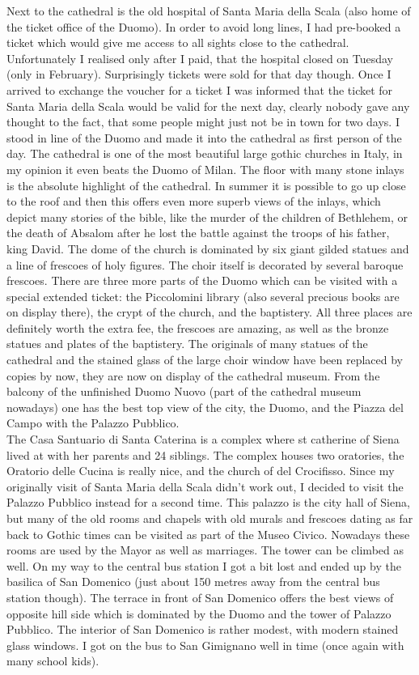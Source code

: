  Next to the cathedral is the old hospital of Santa Maria della Scala (also home of the ticket office of the Duomo). In order to avoid long lines, I had pre-booked a ticket which would give me access to all sights close to the cathedral. Unfortunately I realised only after I paid, that the hospital closed on Tuesday (only in February). Surprisingly tickets were sold for that day though. Once I arrived to exchange the voucher for a ticket I was informed that the ticket for Santa Maria della Scala would be valid for the next day, clearly nobody gave any thought to the fact, that some people might just not be in town for two days. I stood in line of the Duomo and made it into the cathedral as first person of the day. The cathedral is one of the most beautiful large gothic churches in Italy, in my opinion it even beats the Duomo of Milan. The floor with many stone inlays is the absolute highlight of the cathedral. In summer it is possible to go up close to the roof and then this offers even more superb views of the inlays, which depict many stories of the bible, like the murder of the children of Bethlehem, or the death of Absalom after he lost the battle against the troops of his father, king David. The dome of the church is dominated by six giant gilded statues and a line of frescoes of holy figures. The choir itself is decorated by several baroque frescoes. There are three more parts of the Duomo which can be visited with a special extended ticket: the Piccolomini library (also several precious books are on display there), the crypt of the church, and the baptistery. All three places are definitely worth the extra fee, the frescoes are amazing, as well as the bronze statues and plates of the baptistery. The originals of many statues of the cathedral and the stained glass of the large choir window have been replaced by copies by now, they are now on display of the cathedral museum. From the balcony of the unfinished Duomo Nuovo (part of the cathedral museum nowadays) one has the best top view of the city, the Duomo, and the Piazza del Campo with the Palazzo Pubblico.\\
The Casa Santuario di Santa Caterina is a complex where st catherine of Siena lived at with her parents and 24 siblings. The complex houses two oratories, the Oratorio delle Cucina is really nice, and the church of del Crocifisso. Since my originally visit of Santa Maria della Scala didn't work out, I decided to visit the Palazzo Pubblico instead for a second time. This palazzo is the city hall of Siena, but many of the old rooms and chapels with old murals and frescoes dating as far back to Gothic times can be visited as part of the Museo Civico. Nowadays these rooms are used by the Mayor as well as marriages. The tower can be climbed as well. On my way to the central bus station I got a bit lost and ended up by the basilica of San Domenico (just about 150 metres away from the central bus station though). The terrace in front of San Domenico offers the best views of opposite hill side which is dominated by the Duomo and the tower of Palazzo Pubblico. The interior of San Domenico is rather modest, with modern stained glass windows. I got on the bus to San Gimignano well in time (once again with many school kids).\\
